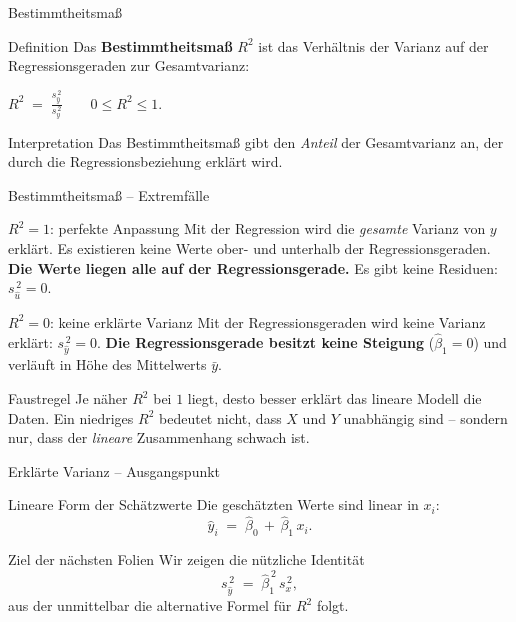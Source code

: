 \documentclass[aspectratio=169,11pt]{beamer}
\begin{document}
\begin{frame}{Bestimmtheitsmaß}
  \begin{block}{Definition}
    Das \textbf{Bestimmtheitsmaß} $R^{2}$ ist das Verhältnis der
    Varianz auf der Regressionsgeraden zur Gesamtvarianz:
    \begin{center}
      $\displaystyle
        R^{2} \;=\; \frac{s_{\hat{y}}^{\,2}}{s_y^{\,2}}
        \qquad 0 \le R^{2} \le 1.$
    \end{center}
  \end{block}

  \begin{exampleblock}{Interpretation}
    Das Bestimmtheitsmaß gibt den \emph{Anteil} der Gesamtvarianz an,
    der durch die Regressionsbeziehung erklärt wird.
  \end{exampleblock}
\end{frame}

\begin{frame}{Bestimmtheitsmaß -- Extremfälle}
  \begin{block}{$R^{2} = 1$: perfekte Anpassung}
    Mit der Regression wird die \emph{gesamte} Varianz von $y$
    erklärt. Es existieren keine Werte ober- und unterhalb der
    Regressionsgeraden. \textbf{Die Werte liegen alle auf der
    Regressionsgerade.} Es gibt keine Residuen: $s_{\hat{u}}^{\,2} = 0$.
  \end{block}

  \begin{alertblock}{$R^{2} = 0$: keine erklärte Varianz}
    Mit der Regressionsgeraden wird keine Varianz erklärt:
    $s_{\hat{y}}^{\,2} = 0$. \textbf{Die Regressionsgerade besitzt
    keine Steigung} ($\hat{\beta}_1 = 0$) und verläuft in Höhe des
    Mittelwerts $\bar{y}$.
  \end{alertblock}

  \begin{exampleblock}{Faustregel}
    Je näher $R^{2}$ bei $1$ liegt, desto besser erklärt das lineare
    Modell die Daten. Ein niedriges $R^{2}$ bedeutet nicht, dass $X$
    und $Y$ unabhängig sind -- sondern nur, dass der \emph{lineare}
    Zusammenhang schwach ist.
  \end{exampleblock}
\end{frame}

\begin{frame}{Erklärte Varianz -- Ausgangspunkt}
  \begin{block}{Lineare Form der Schätzwerte}
    Die geschätzten Werte sind linear in $x_i$:
    \[
      \hat{y}_i \;=\; \hat{\beta}_0 \,+\, \hat{\beta}_1\, x_i.
    \]
  \end{block}

  \begin{exampleblock}{Ziel der nächsten Folien}
    Wir zeigen die nützliche Identität
    \[
      s_{\hat{y}}^{\,2} \;=\; \hat{\beta}_1^{\,2}\, s_x^{\,2},
    \]
    aus der unmittelbar die alternative Formel für $R^{2}$ folgt.
  \end{exampleblock}
\end{frame}
\end{document}
